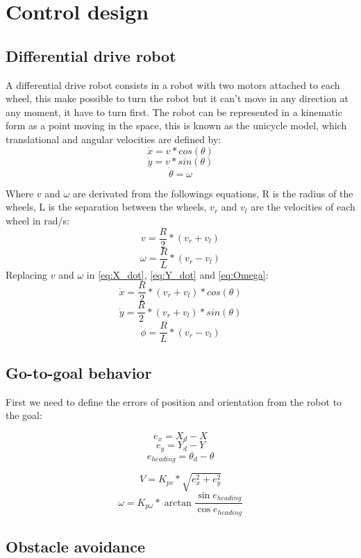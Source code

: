 \section{Control design}
\subsection{Differential drive robot}
A differential drive robot consists in a robot with two motors attached to each wheel, this make possible to turn the robot but it can't move in any direction at any moment, it have to turn first. The robot can be represented in a kinematic form as a point moving in the space, this is known as the unicycle model, which translational and angular velocities are defined by:
\begin{equation}
    \dot{x}=v*cos(\theta)
\label{eq:X_dot}
\end{equation}
\begin{equation}
    \dot{y}=v*sin(\theta)
\label{eq:Y_dot}
\end{equation}
\begin{equation}
    \dot{\theta}=\omega
\label{eq:Omega}
\end{equation}


Where $v$ and $\omega$ are derivated from the followings equations, R is the radius of the wheels, L is the separation between the wheels, $v_{r}$ and $v_{l}$ are the velocities of each wheel in rad/s:
\[v=\frac{R}{2}*(v_r+v_l)\]
\[\omega=\frac{R}{L}*(v_r-v_l)\]
Replacing $v$ and $\omega$ in \autoref{eq:X_dot}, \autoref{eq:Y_dot} and \autoref{eq:Omega}:
\[\dot{x}=\frac{R}{2}*(v_r+v_l)*cos(\theta)\]
\[\dot{y}=\frac{R}{2}*(v_r+v_l)*sin(\theta)\]
\[\dot{\phi}=\frac{R}{L}*(v_r-v_l)\]





\subsection{Go-to-goal behavior}

First we need to define the errors of position and orientation from the robot to the goal:

\[e_x=X_d-X\]
\[e_y=Y_d-Y\]
\[e_{heading}=\theta_d-\theta\]


\[V=K_{pv}*\sqrt{e_x^2+e_y^2}\]
\[\omega=K_{p\omega}*\arctan{\frac{\sin{e_{heading}}}{\cos{e_{heading}}}}\]




\subsection{Obstacle avoidance}


